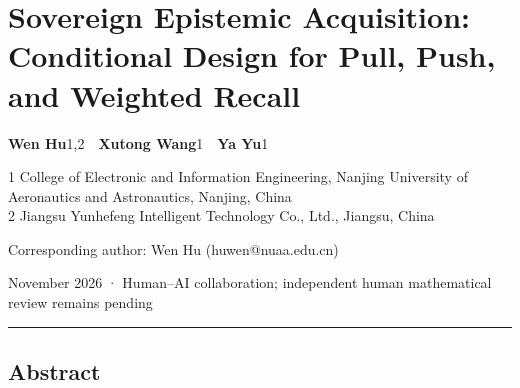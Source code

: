 \documentclass[
  11pt]{article}
\author{}
\date{16 November 2026}
\begin{document}
\section{Sovereign Epistemic Acquisition: Conditional Design for Pull,
Push, and Weighted
Recall}\label{sovereign-epistemic-acquisition-conditional-design-for-pull-push-and-weighted-recall}

\textbf{Wen Hu}1,2~~\textbf{Xutong Wang}1~~\textbf{Ya Yu}1

1 College of Electronic and Information Engineering, Nanjing University
of Aeronautics and Astronautics, Nanjing, China\\
2 Jiangsu Yunhefeng Intelligent Technology Co., Ltd., Jiangsu, China

Corresponding author: Wen Hu (huwen@nuaa.edu.cn)

November 2026 · Human--AI collaboration; independent human mathematical
review remains pending

\begin{center}\rule{0.5\linewidth}{0.5pt}\end{center}

\subsection{Abstract}\label{abstract}
\end{document}
